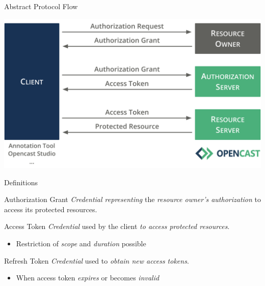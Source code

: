 \documentclass[aspectratio=169]{beamer}
\begin{document}
\begin{frame}{Abstract Protocol Flow}
\begin{overprint}
		\centerline{\includegraphics[height=0.85\textheight]{figures/abstract-protocol-flow-04}}
	\end{overprint}
	\vspace*{-2em}
\end{frame}

\begin{frame}{Definitions}
	\begin{block}{Authorization Grant}
		\emph{Credential representing} the \emph{resource owner’s authorization} to access its protected resources. \hfill {\scriptsize\cite[]{RFC6749}}
	\end{block}
	\pause
	\vspace*{-1.7mm}
	\begin{block}{Access Token}
		\emph{Credential} used by the client \emph{to access protected resources}.
		\begin{itemize}
			\item Restriction of \emph{scope} and \emph{duration} possible \hfill {\scriptsize\cite[]{RFC6749}}
		\end{itemize}
	\end{block}
	\pause
	\vspace*{-1.7mm}
	\begin{block}{Refresh Token}
		\emph{Credential} used to \emph{obtain new access tokens}.
		\begin{itemize}
			\item When access token \emph{expires} or becomes \emph{invalid} \hfill {\scriptsize\cite[]{RFC6749}}
		\end{itemize}
	\end{block}
\end{frame}
\end{document}
